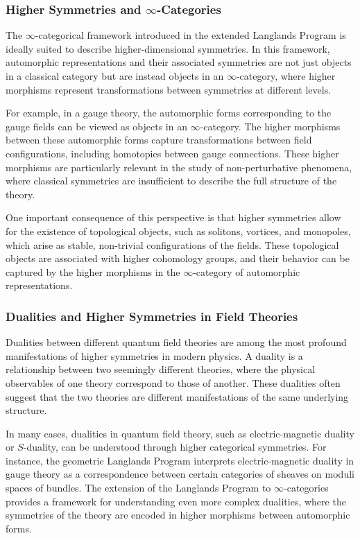\documentclass{article}
\theoremstyle{remark}
\begin{document}
\subsubsection{Higher Symmetries and $\infty$-Categories}

The $\infty$-categorical framework introduced in the extended Langlands Program is ideally suited to describe higher-dimensional symmetries. In this framework, automorphic representations and their associated symmetries are not just objects in a classical category but are instead objects in an $\infty$-category, where higher morphisms represent transformations between symmetries at different levels.

For example, in a gauge theory, the automorphic forms corresponding to the gauge fields can be viewed as objects in an $\infty$-category. The higher morphisms between these automorphic forms capture transformations between field configurations, including homotopies between gauge connections. These higher morphisms are particularly relevant in the study of non-perturbative phenomena, where classical symmetries are insufficient to describe the full structure of the theory.

One important consequence of this perspective is that higher symmetries allow for the existence of topological objects, such as solitons, vortices, and monopoles, which arise as stable, non-trivial configurations of the fields. These topological objects are associated with higher cohomology groups, and their behavior can be captured by the higher morphisms in the $\infty$-category of automorphic representations.

\subsubsection{Dualities and Higher Symmetries in Field Theories}

Dualities between different quantum field theories are among the most profound manifestations of higher symmetries in modern physics. A duality is a relationship between two seemingly different theories, where the physical observables of one theory correspond to those of another. These dualities often suggest that the two theories are different manifestations of the same underlying structure.

In many cases, dualities in quantum field theory, such as electric-magnetic duality or $S$-duality, can be understood through higher categorical symmetries. For instance, the geometric Langlands Program interprets electric-magnetic duality in gauge theory as a correspondence between certain categories of sheaves on moduli spaces of bundles. The extension of the Langlands Program to $\infty$-categories provides a framework for understanding even more complex dualities, where the symmetries of the theory are encoded in higher morphisms between automorphic forms.
\end{document}
